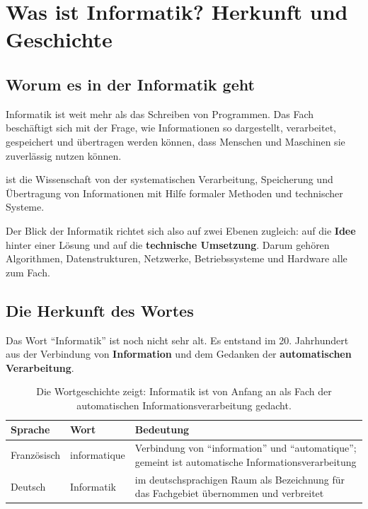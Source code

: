 \chapter{Was ist Informatik? Herkunft und Geschichte}\label{ch:geschichte_informatik}

\section{Worum es in der Informatik geht}

Informatik ist weit mehr als das Schreiben von Programmen. Das Fach beschäftigt sich mit der Frage, wie Informationen so dargestellt, verarbeitet, gespeichert und übertragen werden können, dass Menschen und Maschinen sie zuverlässig nutzen können.

\begin{mydefinition}[Informatik]
     ist die Wissenschaft von der systematischen Verarbeitung, Speicherung und Übertragung von Informationen mit Hilfe formaler Methoden und technischer Systeme.
\end{mydefinition}

Der Blick der Informatik richtet sich also auf zwei Ebenen zugleich: auf die \textbf{Idee} hinter einer Lösung und auf die \textbf{technische Umsetzung}. Darum gehören Algorithmen, Datenstrukturen, Netzwerke, Betriebssysteme und Hardware alle zum Fach.

\section{Die Herkunft des Wortes}

Das Wort \enquote{Informatik} ist noch nicht sehr alt. Es entstand im 20. Jahrhundert aus der Verbindung von \textbf{Information} und dem Gedanken der \textbf{automatischen Verarbeitung}.

\begin{table}[H]
    \centering
    \begin{tabular}{l|l|p{8.2cm}}
        \textbf{Sprache} & \textbf{Wort} & \textbf{Bedeutung} \\ \midrule\midrule
        Französisch & informatique & Verbindung von \enquote{information} und \enquote{automatique}; gemeint ist automatische Informationsverarbeitung \\ \midrule
        Deutsch & Informatik & im deutschsprachigen Raum als Bezeichnung für das Fachgebiet übernommen und verbreitet \\
    \end{tabular}
    \caption{Die Wortgeschichte zeigt: Informatik ist von Anfang an als Fach der automatischen Informationsverarbeitung gedacht.}
    \label{tab:wortherkunft}
\end{table}

